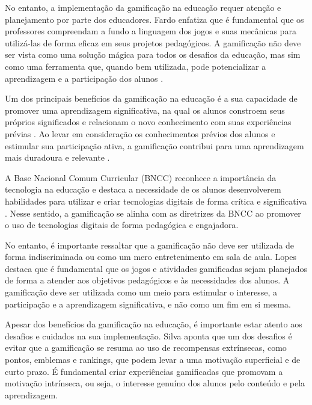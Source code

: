 No entanto, a implementação da gamificação na educação requer atenção e planejamento por parte dos educadores. Fardo \cite{fardo2013gamificaccao} enfatiza que é fundamental que os professores compreendam a fundo a linguagem dos jogos e suas mecânicas para utilizá-las de forma eficaz em seus projetos pedagógicos. A gamificação não deve ser vista como uma solução mágica para todos os desafios da educação, mas sim como uma ferramenta que, quando bem utilizada, pode potencializar a aprendizagem e a participação dos alunos \cite{fardo2013gamificaccao}.

Um dos principais benefícios da gamificação na educação é a sua capacidade de promover uma aprendizagem significativa, na qual os alunos constroem seus próprios significados e relacionam o novo conhecimento com suas experiências prévias \cite{lemos2011aprendizagem}. Ao levar em consideração os conhecimentos prévios dos alunos e estimular sua participação ativa, a gamificação contribui para uma aprendizagem mais duradoura e relevante \cite{pelizzari2002teoria}.

A Base Nacional Comum Curricular (BNCC) reconhece a importância da tecnologia na educação e destaca a necessidade de os alunos desenvolverem habilidades para utilizar e criar tecnologias digitais de forma crítica e significativa \cite{brasil2018base}. Nesse sentido, a gamificação se alinha com as diretrizes da BNCC ao promover o uso de tecnologias digitais de forma pedagógica e engajadora.

No entanto, é importante ressaltar que a gamificação não deve ser utilizada de forma indiscriminada ou como um mero entretenimento em sala de aula. Lopes \cite{lopes2022uso} destaca que é fundamental que os jogos e atividades gamificadas sejam planejados de forma a atender aos objetivos pedagógicos e às necessidades dos alunos. A gamificação deve ser utilizada como um meio para estimular o interesse, a participação e a aprendizagem significativa, e não como um fim em si mesma.

Apesar dos benefícios da gamificação na educação, é importante estar atento aos desafios e cuidados na sua implementação. Silva \cite{silva2017recurso} aponta que um dos desafios é evitar que a gamificação se resuma ao uso de recompensas extrínsecas, como pontos, emblemas e rankings, que podem levar a uma motivação superficial e de curto prazo. É fundamental criar experiências gamificadas que promovam a motivação intrínseca, ou seja, o interesse genuíno dos alunos pelo conteúdo e pela aprendizagem.

